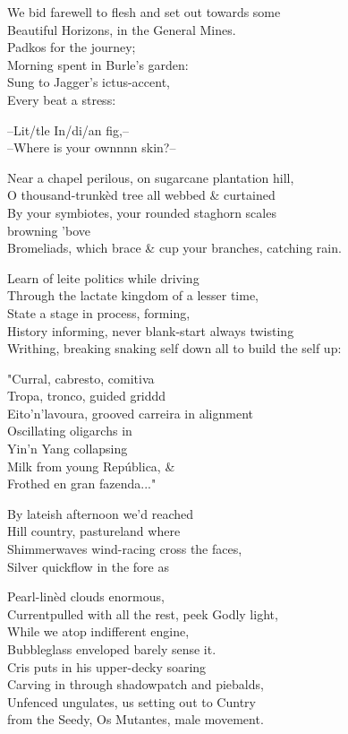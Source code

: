 We bid farewell to flesh and set out towards some \\
Beautiful Horizons, in the General Mines. \\

Padkos for the journey; \\
Morning spent in Burle's garden: \\
Sung to Jagger's ictus-accent, \\
Every beat a stress:

--Lit/tle In/di/an fig,-- \\
--Where is your ownnnn skin?--

Near a chapel perilous, on sugarcane plantation hill, \\
O thousand-trunkèd tree all webbed \& curtained \\
By your symbiotes, your rounded staghorn scales \\
\qquad browning 'bove \\
Bromeliads, which brace \& cup your branches, catching rain.

Learn of leite politics while driving \\
Through the lactate kingdom of a lesser time, \\
State a stage in process, forming, \\
History informing, never blank-start always twisting \\
Writhing, breaking snaking self down all to build the self up:

"Curral, cabresto, comitiva \\
Tropa, tronco, guided griddd \\
Eito'n'lavoura, grooved carreira in alignment \\
Oscillating oligarchs in \\
Yin'n Yang collapsing \\
Milk from young República, \& \\
Frothed en gran fazenda..."

By lateish afternoon we'd reached \\
Hill country, pastureland where \\
Shimmerwaves wind-racing cross the faces, \\
Silver quickflow in the fore as

Pearl-linèd clouds enormous, \\
Currentpulled with all the rest, peek Godly light, \\
While we atop indifferent engine, \\
Bubbleglass enveloped barely sense it. \\
Cris puts in his upper-decky soaring \\
Carving in through shadowpatch and piebalds, \\
Unfenced ungulates, us setting out to Cuntry \\
from the Seedy, Os Mutantes, male movement.

